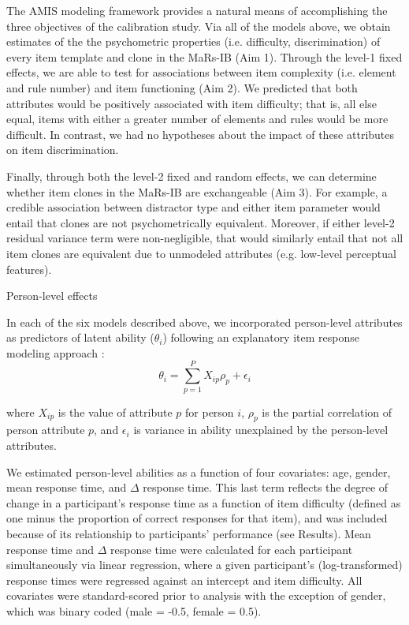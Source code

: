 \documentclass[a4paper,man,natbib]{apa6}
\makeatletter
\renewcommand{\subsubsection}{\@startsection{subsubsection}{3}
  {\z@}%
  {\b@level@two@skip}{\e@level@two@skip}%
  {\normalfont\normalsize\bfseries}}
\makeatother
\begin{document}
The AMIS modeling framework provides a natural means of accomplishing the three objectives of the calibration study. Via all of the models above, we obtain estimates of the the psychometric properties (i.e. difficulty, discrimination) of every item template and clone in the MaRs-IB (Aim 1). Through the level-1 fixed effects, we are able to test for associations between item complexity (i.e. element and rule number) and item functioning (Aim 2). We predicted that both attributes would be positively associated with item difficulty; that is, all else equal, items with either a greater number of elements and rules would be more difficult. In contrast, we had no hypotheses about the impact of these attributes on item discrimination. 

Finally, through both the level-2 fixed and random effects, we can determine whether item clones in the MaRs-IB are exchangeable (Aim 3). For example, a credible association between distractor type and either item parameter would entail that clones are not psychometrically equivalent. Moreover, if either level-2 residual variance term were non-negligible, that would similarly entail that not all item clones are equivalent due to unmodeled attributes (e.g. low-level perceptual features).

\subsubsection{Person-level effects}

In each of the six models described above, we incorporated person-level attributes as predictors of latent ability ($\theta_i$) following an explanatory item response modeling approach \citep{wilson2008explanatory}: 
\begin{equation} \label{eq:4}
\theta_i = \sum_{p=1}^P X_{ip} \rho_p + \epsilon_i    
\end{equation}

\noindent where $X_{ip}$ is the value of attribute $p$ for person $i$, $\rho_p$ is the partial correlation of person attribute $p$, and $\epsilon_i$ is variance in ability unexplained by the person-level attributes. 

We estimated person-level abilities as a function of four covariates: age, gender, mean response time, and $\Delta$ response time. This last term reflects the degree of change in a participant's response time as a function of item difficulty (defined as one minus the proportion of correct responses for that item), and was included because of its relationship to participants' performance (see Results). Mean response time and $\Delta$ response time were calculated for each participant simultaneously via linear regression, where a given participant's (log-transformed) response times were regressed against an intercept and item difficulty. All covariates were standard-scored prior to analysis with the exception of gender, which was binary coded (male = -0.5, female = 0.5).
\end{document}
